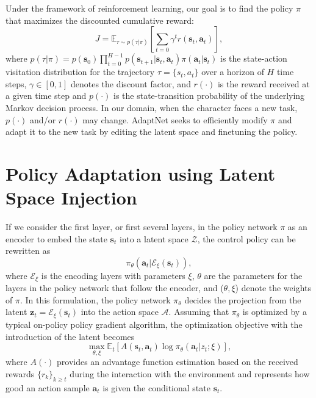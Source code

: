 Under the framework of reinforcement learning, 
our goal is to find the policy $\pi$ that maximizes the discounted cumulative reward: 
\begin{equation}
J = \mathbb{E}_{\tau \sim p(\tau\vert \pi)} \left[\sum_{t=0}\gamma^tr(\mathbf{s}_t,\mathbf{a}_t)\right], 
\end{equation}
where $p(\tau \vert \pi) = p(\mathbf{s}_0)\prod_{t=0}^{H-1} p(\mathbf{s}_{t+1}\vert \mathbf{s}_t, \mathbf{a}_t)\pi(\mathbf{a}_t \vert \mathbf{s}_t)$ is the state-action visitation distribution for the trajectory $\tau = \{s_t, a_t\}$ over a horizon of $H$ time steps,  
$\gamma \in [0,1]$ denotes the discount factor, 
and $r(\cdot)$ is the reward received at a given time step %
and $p(\cdot)$ is the state-transition probability of the underlying Markov decision process. 
In our domain, when the character faces a new task, $p(\cdot)$ and/or $r(\cdot)$ may change. 
AdaptNet seeks to efficiently modify $\pi$ and adapt it to the new task by 
editing the latent space and finetuning the policy. 








\section{Policy Adaptation using Latent Space Injection}\label{sec:method_inject}


If we consider the first layer, or first several layers, in the policy network $\pi$ as an encoder to embed the state $\mathbf{s}_t$ into a latent space $\mathcal{Z}$, the control policy 
can be rewritten as
\begin{equation}
    \pi_\theta(\mathbf{a}_t \vert \mathcal{E}_\xi(\mathbf{s}_t)), 
\end{equation}
where $\mathcal{E}_\xi$ is the encoding layers with parameters $\xi$, $\theta$ are the parameters for the layers in the policy network that follow the encoder, and ($\theta, \xi$) denote the weights of $\pi$. 
In this formulation, 
the policy network $\pi_\theta$ decides the projection from the latent $\mathbf{z}_t = \mathcal{E}_\xi(\mathbf{s}_t)$ into the action space $\mathcal{A}$.
Assuming that %
$\pi_\theta$ 
is optimized by a typical on-policy policy gradient algorithm, the optimization objective with the introduction of the latent becomes 
\begin{equation}\label{eq:rl_loss}
    \max_{\theta,\xi} \mathbb{E}_t \left[A(\mathbf{s}_t, \mathbf{a}_t) \log\pi_\theta(\mathbf{a}_t \vert
    z_t; \xi)\right],
\end{equation}
where $A(\cdot)$ provides an advantage function estimation based on the received rewards $\{r_k\}_{k\geq t}$ during the interaction with the environment and represents how good an action sample $\mathbf{a}_t$ is given the conditional state $\mathbf{s}_t$. 

